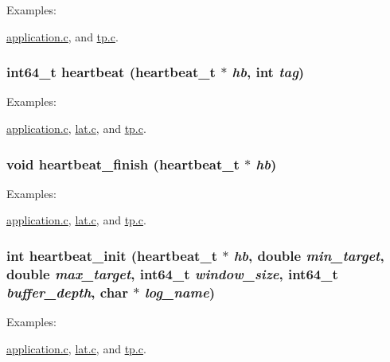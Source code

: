 \begin{Desc}
\item[Examples: ]\par
\hyperlink{application_8c-example}{application.c}, and \hyperlink{tp_8c-example}{tp.c}.\end{Desc}
\hypertarget{heartbeat-file_8c_83cee6dbfb8365b1595ef200f45fe6fc}{
\subsubsection[heartbeat]{\setlength{\rightskip}{0pt plus 5cm}int64\_\-t heartbeat ({\bf heartbeat\_\-t} $\ast$ {\em hb}, \/  int {\em tag})}}
\label{heartbeat-file_8c_83cee6dbfb8365b1595ef200f45fe6fc}


\begin{Desc}
\item[Examples: ]\par
\hyperlink{application_8c-example}{application.c}, \hyperlink{lat_8c-example}{lat.c}, and \hyperlink{tp_8c-example}{tp.c}.\end{Desc}
\hypertarget{heartbeat-file_8c_472683cf2037492695c74b37944efca9}{
\subsubsection[heartbeat\_\-finish]{\setlength{\rightskip}{0pt plus 5cm}void heartbeat\_\-finish ({\bf heartbeat\_\-t} $\ast$ {\em hb})}}
\label{heartbeat-file_8c_472683cf2037492695c74b37944efca9}


\begin{Desc}
\item[Examples: ]\par
\hyperlink{application_8c-example}{application.c}, \hyperlink{lat_8c-example}{lat.c}, and \hyperlink{tp_8c-example}{tp.c}.\end{Desc}
\hypertarget{heartbeat-file_8c_b0215f451a25327778cf2469bbf17808}{
\subsubsection[heartbeat\_\-init]{\setlength{\rightskip}{0pt plus 5cm}int heartbeat\_\-init ({\bf heartbeat\_\-t} $\ast$ {\em hb}, \/  double {\em min\_\-target}, \/  double {\em max\_\-target}, \/  int64\_\-t {\em window\_\-size}, \/  int64\_\-t {\em buffer\_\-depth}, \/  char $\ast$ {\em log\_\-name})}}
\label{heartbeat-file_8c_b0215f451a25327778cf2469bbf17808}


\begin{Desc}
\item[Examples: ]\par
\hyperlink{application_8c-example}{application.c}, \hyperlink{lat_8c-example}{lat.c}, and \hyperlink{tp_8c-example}{tp.c}.\end{Desc}
